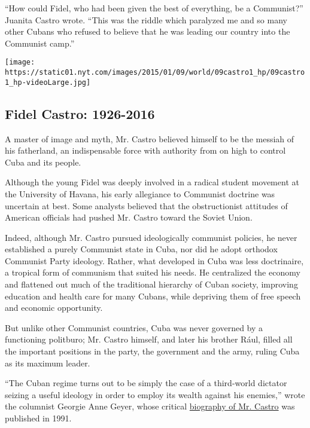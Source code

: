 ``How could Fidel, who had been given the best of everything, be a
Communist?'' Juanita Castro wrote. ``This was the riddle which paralyzed
me and so many other Cubans who refused to believe that he was leading
our country into the Communist camp.''

\href{https://www.nytimes.com/interactive/2016/11/26/world/americas/fidel-castro-timeline.html}{}

\texttt{[image: https://static01.nyt.com/images/2015/01/09/world/09castro1\_hp/09castro1\_hp-videoLarge.jpg]}

\hypertarget{fidel-castro-1926-2016}{%
\subsection{Fidel Castro: 1926-2016}\label{fidel-castro-1926-2016}}

A master of image and myth, Mr. Castro believed himself to be the
messiah of his fatherland, an indispensable force with authority from on
high to control Cuba and its people.

Although the young Fidel was deeply involved in a radical student
movement at the University of Havana, his early allegiance to Communist
doctrine was uncertain at best. Some analysts believed that the
obstructionist attitudes of American officials had pushed Mr. Castro
toward the Soviet Union.

Indeed, although Mr. Castro pursued ideologically communist policies, he
never established a purely Communist state in Cuba, nor did he adopt
orthodox Communist Party ideology. Rather, what developed in Cuba was
less doctrinaire, a tropical form of communism that suited his needs. He
centralized the economy and flattened out much of the traditional
hierarchy of Cuban society, improving education and health care for many
Cubans, while depriving them of free speech and economic opportunity.

But unlike other Communist countries, Cuba was never governed by a
functioning politburo; Mr. Castro himself, and later his brother Rául,
filled all the important positions in the party, the government and the
army, ruling Cuba as its maximum leader.

``The Cuban regime turns out to be simply the case of a third-world
dictator seizing a useful ideology in order to employ its wealth against
his enemies,'' wrote the columnist Georgie Anne Geyer, whose critical
\href{http://www.nytimes.com/1991/02/10/books/the-last-stalinist.html}{biography
of Mr. Castro} was published in 1991.

